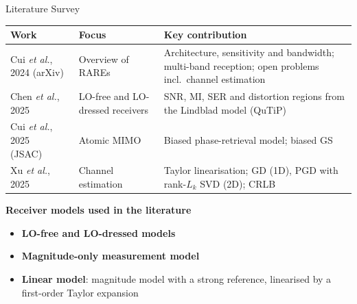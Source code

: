 \documentclass[10pt,xcolor=x11names,compress,aspectratio=169]{beamer}
\begin{document}
\begin{frame}{Literature Survey}
\small
\renewcommand{\arraystretch}{1.3}
\begin{tabular}{>{\raggedright\arraybackslash}p{3.4cm}>{\raggedright\arraybackslash}p{3.4cm}>{\raggedright\arraybackslash}p{7.2cm}}
\toprule
\textbf{Work} & \textbf{Focus} & \textbf{Key contribution}\\
\midrule
Cui \textit{et al.}, 2024 (arXiv)~\cite{cui2026rare} & Overview of RAREs & Architecture, sensitivity and bandwidth; multi-band reception; open problems incl.\ channel estimation\\
\addlinespace[6pt]
Chen \textit{et al.}, 2025~\cite{chen2025harnessing} & LO-free and LO-dressed receivers & SNR, MI, SER and distortion regions from the Lindblad model (QuTiP)\\
\addlinespace[6pt]
Cui \textit{et al.}, 2025 (JSAC)~\cite{cui2025towards} & Atomic MIMO & Biased phase-retrieval model; biased GS \\
\addlinespace[6pt]
Xu \textit{et al.}, 2025~\cite{xu2025channel} & Channel estimation & Taylor linearisation; GD (1D), PGD with rank-$L_k$ SVD (2D); CRLB\\
\bottomrule
\end{tabular}

\vspace{4mm}
\footnotesize\textbf{Receiver models used in the literature}
\begin{itemize}\footnotesize\setlength\itemsep{2pt}
  \item \textbf{LO-free and LO-dressed models}~\cite{chen2025harnessing}
  \item \textbf{Magnitude-only measurement model}~\cite{cui2025towards}
  \item \textbf{Linear model}: magnitude model with a strong reference, linearised by a first-order Taylor expansion~\cite{xu2025channel}
\end{itemize}
\end{frame}

\end{document}
